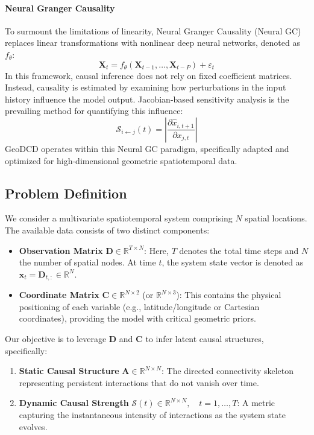 \documentclass{article}
\begin{document}
\paragraph{Neural Granger Causality}
To surmount the limitations of linearity, Neural Granger Causality (Neural GC) replaces linear transformations with nonlinear deep neural networks, denoted as $f_\theta$:
\begin{equation}
    \mathbf{X}_t = f_\theta(\mathbf{X}_{t-1}, \dots, \mathbf{X}_{t-P}) + \varepsilon_t
\end{equation}
In this framework, causal inference does not rely on fixed coefficient matrices. Instead, causality is estimated by examining how perturbations in the input history influence the model output. Jacobian-based sensitivity analysis is the prevailing method for quantifying this influence:
\begin{equation}
    \mathcal{S}_{i\leftarrow j}(t) = \left| \frac{\partial \hat{x}_{i, t+1}}{\partial x_{j, t}} \right|
\end{equation}
GeoDCD operates within this Neural GC paradigm, specifically adapted and optimized for high-dimensional geometric spatiotemporal data.

\subsection{Problem Definition}
We consider a multivariate spatiotemporal system comprising $N$ spatial locations. The available data consists of two distinct components:

\begin{itemize}
    \item \textbf{Observation Matrix} $\mathbf{D} \in \mathbb{R}^{T \times N}$: Here, $T$ denotes the total time steps and $N$ the number of spatial nodes. At time $t$, the system state vector is denoted as $\mathbf{x}_t = \mathbf{D}_{t, :} \in \mathbb{R}^N$.
    \item \textbf{Coordinate Matrix} $\mathbf{C} \in \mathbb{R}^{N \times 2}$ (or $\mathbb{R}^{N \times 3}$): This contains the physical positioning of each variable (e.g., latitude/longitude or Cartesian coordinates), providing the model with critical geometric priors.
\end{itemize}

Our objective is to leverage $\mathbf{D}$ and $\mathbf{C}$ to infer latent causal structures, specifically:
\begin{enumerate}
    \item \textbf{Static Causal Structure} $\mathbf{A} \in \mathbb{R}^{N \times N}$: The directed connectivity skeleton representing persistent interactions that do not vanish over time.
    \item \textbf{Dynamic Causal Strength} $\mathcal{S}(t) \in \mathbb{R}^{N \times N}, \quad t=1, \dots, T$: A metric capturing the instantaneous intensity of interactions as the system state evolves.
\end{enumerate}
\end{document}
